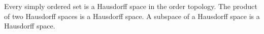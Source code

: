 \begin{proposition}
Every simply ordered set is a Hausdorff space in the order topology. The product of two Hausdorff spaces is a Hausdorff space. A subspace of a Hausdorff space is a Hausdorff space.
\end{proposition}

\begin{comment}
\begin{definition}
A topological space $(X,\mathcal{T})$ is \vocab{metrisable} if it arises from (at least oe) metric space $(X,d)$, i.e. there is at least one metric $d$ on $X$ such that $\mathcal{T}=\mathcal{T}_d$.
\end{definition}

\begin{definition}
Two metrics on a set are \vocab{topologically equivalent} if they give rise to the same topology.
\end{definition}

\begin{example}
\begin{itemize}
\item The metrics $d_1$, $d_2$, $d_\infty$ on $\RR^n$ are all topologically equivalent. (Recall that $d_1$, $d_2$, $d_\infty$ are the metrics arising from the norms $\norm{\cdot}_1$, $\norm{\cdot}_2$, $\norm{\cdot}_\infty$, respectively.)
We shall call the topology defined by the above metrics the \emph{standard} (or canonical) topology on $\RR^n$.
\item The discrete topology on a non-empty set $X$ is metrisable, using the metric
\[d(x,y)=\begin{cases}
0&\text{if }x=y,\\
1&\text{if }x\neq y.
\end{cases}\]
It is easy to check that this is a metric. To see that is gives the discrete topology, consider any subset $U\subset X$. Then for every $x\in U$, $B_\frac{1}{2}(x)\subset U$.
\end{itemize}
\end{example}

\begin{definition}
Given two topologies $\mathcal{T}_1$ and $\mathcal{T}_2$ on the same set, we say $\mathcal{T}_1$ is \vocab{coarser} than $\mathcal{T}_2$ if $\mathcal{T}_1\subset\mathcal{T}2$.
\end{definition}

\begin{remark}
For any space $(X,\mathcal{T})$, the indiscrete topology on $X$ is coarser than $\mathcal{T}$ which in turn is coarser than the discrete topology on $X$.
\end{remark}


\end{comment}

